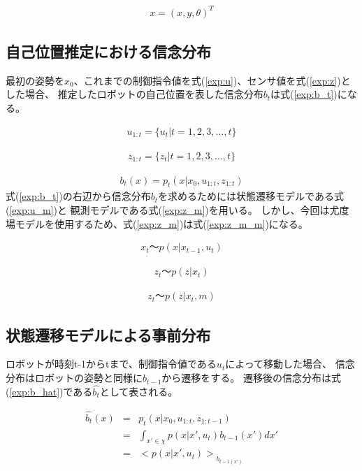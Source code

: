\begin{eqnarray}
  \label{exp:x}
  x = (x, y ,\theta)^T
\end{eqnarray}

\subsection{自己位置推定における信念分布}

最初の姿勢を$x_0$、これまでの制御指令値を式(\ref{exp:u})、センサ値を式(\ref{exp:z})とした場合、
推定したロボットの自己位置を表した信念分布$b_t$は式(\ref{exp:b_t})になる。

\begin{eqnarray}
  \label{exp:u}
  u_{1:t} = \{u_t|t=1,2,3,...,t\} 
\end{eqnarray}

\begin{eqnarray}
  \label{exp:z}
  z_{1:t} = \{z_t|t=1,2,3,...,t\} 
\end{eqnarray}

\begin{eqnarray}
  \label{exp:b_t}
  b_t(x) = p_t(x|x_0, u_{1:t}, z_{1:t}) 
\end{eqnarray}
式(\ref{exp:b_t})の右辺から信念分布$b_t$を求めるためには状態遷移モデルである式(\ref{exp:u_m})と
観測モデルである式(\ref{exp:z_m})を用いる。
しかし、今回は尤度場モデルを使用するため、式(\ref{exp:z_m})は式(\ref{exp:z_m_m})になる。

\begin{eqnarray}
  \label{exp:u_m}
  x_t 〜 p(x|x_{t-1}, u_t)
\end{eqnarray}

\begin{eqnarray}
  \label{exp:z_m}
  z_t 〜 p(z|x_t)
\end{eqnarray}

\begin{eqnarray}
  \label{exp:z_m_m}
  z_t 〜 p(z|x_t, m)
\end{eqnarray}

\subsection{状態遷移モデルによる事前分布}

ロボットが時刻t-1からtまで、制御指令値である$u_t$によって移動した場合、
信念分布はロボットの姿勢と同様に$b_{t-1}$から遷移をする。
遷移後の信念分布は式(\ref{exp:b_hat})である$\hat{b_t}$として表される。

\begin{eqnarray}
  \label{exp:b_hat}
  \hat{b_t}(x) &=& p_t(x|x_0, u_{1:t}, z_{1:t-1}) \nonumber \\
  &=& \int_{x'\in\chi} p(x|x', u_t)b_{t-1}(x')dx' \nonumber \\
  &=& {<p(x|x', u_t)>}_{b_{t-1(x')}}
\end{eqnarray}

